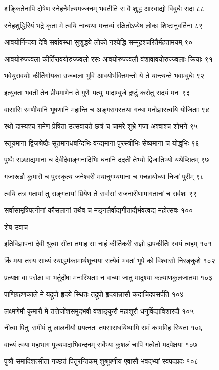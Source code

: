 शङ्कितेनापि दोषेण स्नेहनैर्मल्यमज्जनम्
भवतीति स वै शुद्ध आस्वाद्यो विबुधैः सदा ८८

स्नेहशुद्धिरियं भद्रे कृता मे त्वयि नान्यथा
मन्तव्यं रक्षितोऽप्येष लोकः शिष्टानुवर्तिना ८९

आवयोर्निन्दया देवि सर्वावस्था सुशुद्धये
लोको नश्येद्धि सम्मूढश्चरितैर्महतामयम् ९०

आवयोरुज्ज्वला कीर्तिरावयोरुज्ज्वलो रसः
आवयोरुज्ज्वलौ वंशावावयोरुज्ज्वलाः क्रियाः ९१

भवेयुरावयोः कीर्तिर्गायका उज्ज्वला भुवि
आवयोर्भक्तिमन्तो ये ते यान्त्यन्ते भवाम्बुधेः ९२

इत्युक्ता भवती तेन प्रीयमाणेन ते गुणैः
पत्युः पादाम्बुजे द्रष्टुं करोतु सदयं मनः ९३

वासांसि रमणीयानि भूषणानि महान्ति च
अङ्गरागस्तथा गन्धा मनोज्ञास्त्वयि योजिताः ९४

रथो दास्यश्च रामेण प्रेषिता उत्सवायते
छत्रं च चामरे शुभ्रे गजा अश्वाश्च शोभने ९५

स्तूयमाना द्विजश्रेष्ठैः सूतमागधबन्दिभिः
वन्द्यमाना पुरस्त्रीभिः सेव्यमाना च योद्धृभिः ९६

पुष्पैः सञ्छाद्यमाना च देवीदेवाङ्गनादिभिः
धनानि ददती तेभ्यो द्विजातिभ्यो यथेप्सितम् ९७

गजारूढौ कुमारौ च पुरस्कृत्य जनेश्वरी
मयानुगम्यमाना च गच्छायोध्यां निजां पुरीम् ९८

त्वयि तत्र गतायां तु सङ्गतायां प्रियेण ते
सर्वासां राजनारीणामागतानां च सर्वशः ९९

सर्वासामृषिपत्नीनां कौसलानां तथैव च
मङ्गलैर्वाद्यगीताद्यैर्भवत्वद्य महोत्सवः १००

शेष उवाच-

इतिविज्ञापनां देवी श्रुत्वा सीता तमाह सा
नाहं कीर्तिकरी राज्ञो ह्यपकीर्तिः स्वयं त्वहम् १०१

किं मया तस्य साध्यं स्याद्धर्मकामार्थशून्यया
सत्येवं भवतां भूपे को विश्वासो निरङ्कुशे १०२

प्रत्यक्षा वा परोक्षा वा भर्तुर्दोषा मनःस्थिताः
न वाच्या जातु मादृश्या कल्याणकुलजातया १०३

पाणिग्रहणकाले मे यद्रूपो हृदये स्थितः
तद्रूपो हृदयान्नासौ कदाचिदपसर्पति १०४

लक्ष्मणेमौ कुमारौ मे तत्तेजोंशसमुद्भवौ
वंशाङ्कुरौ महाशूरौ धनुर्विद्याविशारदौ १०५

नीत्वा पितुः समीपं तु लालनीयौ प्रयत्नतः
तपसाराधयिष्यामि रामं काममिह स्थिता १०६

वाच्यं त्वया महाभाग पूज्यपादाभिवन्दनम्
सर्वेभ्यः कुशलं चापि गत्वेतो मदपेक्षया १०७

पुत्रौ समादिशत्सीता गच्छतं पितुरन्तिकम्
शुश्रूषणीय एवासौ भवद्भ्यां स्वपदप्रदः १०८

